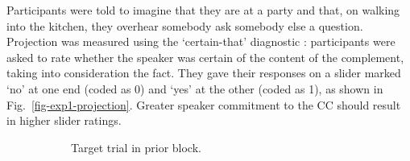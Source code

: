 \documentclass[11pt,fleqn]{article}
\newcommand{\figref}[1]{Fig.~\ref{#1}}
\newcommand{\6}{\mbox{$[\hspace*{-.6mm}[$}}
\newcommand{\9}{\mbox{$]\hspace*{-.6mm}]$}}
\begin{document}
Participants were told to imagine that they are at a party and that, on walking into the kitchen, they overhear somebody ask somebody else a question. Projection was measured using the `certain-that' diagnostic \cite{djaerv-bacovcin-salt27,tbd-variability, lorson2018, mahler2020}: participants were asked to rate whether the speaker was certain of the content of the complement, taking into consideration the fact. They gave their responses on a slider marked `no' at one end (coded as 0) and `yes' at the other (coded as 1), as shown in \figref{fig-exp1-projection}. Greater speaker commitment to the CC should result in higher slider ratings.

\begin{figure}[h!]
\centering

\begin{subfigure}[t]{0.5\textwidth}
        \centering
{}
\caption{Target trial in prior block.}\label{fig-exp1-prior}
\end{subfigure}%
\begin{subfigure}[t]{0.5\textwidth}
\centering
{} 

\end{subfigure}
\end{figure}
\end{document}
